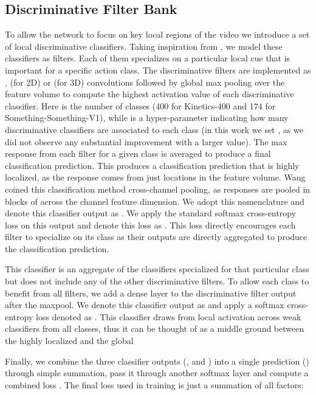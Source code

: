 \documentclass[10pt,twocolumn,letterpaper]{article}
\begin{document}
\subsection{Discriminative Filter Bank}
\label{sec:filter_banks}
To allow the network to focus on key local regions of the video we introduce a set of local discriminative classifiers. Taking inspiration from \cite{DiscriminativeFilterBank_CVPR18}, we model these classifiers as filters. Each of them specializes on a particular local cue that is important for a specific action class. 
The discriminative filters are implemented as ,  (for 2D) or  (for 3D) convolutions followed by global max pooling over the feature volume to compute the highest activation value of each discriminative classifier. Here  is the number of classes (400 for Kinetics-400 and 174 for Something-Something-V1), while  is a hyper-parameter indicating how many discriminative classifiers are associated to each class (in this work we set , as we did not observe any substantial improvement with a larger value). The max response from each filter for a given class is averaged to produce a final classification prediction. This produces a classification prediction that is highly localized, as the response comes from just  locations in the feature volume. Wang \etal \cite{DiscriminativeFilterBank_CVPR18} coined this classification method cross-channel pooling, as responses are pooled in blocks of  across the channel feature dimension. We adopt this nomenclature and denote this classifier output as . We apply the standard softmax cross-entropy loss on this output and denote this loss as . This loss directly encourages each filter to specialize on its class as their outputs are directly aggregated to produce the classification prediction.

This classifier is an aggregate of the  classifiers specialized for that particular class but does not include any of the  other discriminative filters. To allow each class to benefit from all filters, we add a dense layer to the discriminative filter output after the maxpool. We denote this classifier output as  and apply a softmax cross-entropy loss denoted as . This classifier draws from local activation across weak classifiers from all classes, thus it can be thought of as a middle ground between the highly localized  and the global  

Finally, we combine the three classifier outputs (,  and ) into a single prediction () through simple summation, pass it through another softmax layer and compute a combined loss . The final loss used in training is just a summation of all factors:
\end{document}
